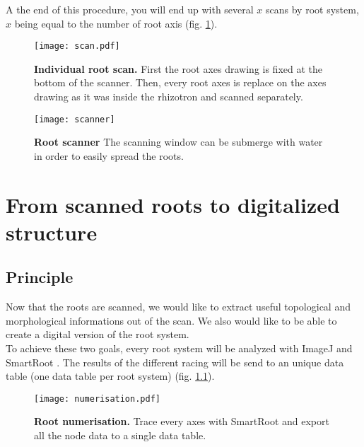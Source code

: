 \documentclass[a4paper,english,10pt]{report}
\begin{document}
A the end of this procedure, you will end up with several $x$ scans by root system, $x$ being equal to the number of root axis (fig. \ref{scan}).  


\begin{figure}[htbp]
\begin{center}
\texttt{[image: scan.pdf]}
\caption[Individual root scan]{\textbf{Individual root scan.} First the root axes drawing is fixed at the bottom of the scanner. Then, every root axes is replace on the axes drawing as it was inside the rhizotron and scanned separately.}
\label{scan}
\end{center}
\end{figure}

\begin{figure}[htbp]
\begin{center}
\texttt{[image: scanner]}
\caption[Root scanner]{\textbf{Root scanner} The scanning window can be submerge with water in order to easily spread the roots.}
\label{scanner}
\end{center}
\end{figure}


\chapter{From scanned roots to digitalized structure}

\section{Principle}

Now that the roots are scanned, we would like to extract useful topological and morphological informations out of the scan. We also would like to be able to create a digital version of the root system.\\

To achieve these two goals, every root system will be analyzed with ImageJ \cite{Rasband11} and SmartRoot \cite{Lobet11}. The results of the different racing will be send to an unique data table (one data table per root system) (fig. \ref{numerisation}).\\

\begin{figure}[htbp]
\begin{center}
\texttt{[image: numerisation.pdf]}
\caption[Root numerisation.]{\textbf{Root numerisation.} Trace every axes with SmartRoot and export all the node data to a single data table.}
\label{numerisation}
\end{center}
\end{figure}
\end{document}

